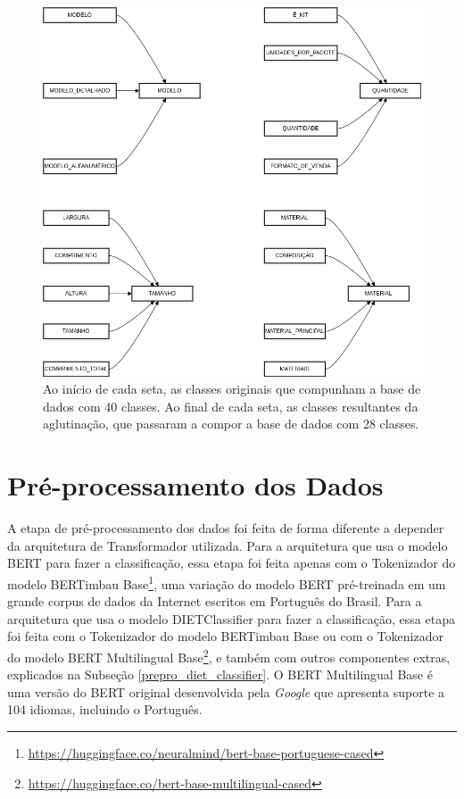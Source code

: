 \begin{figure}[!htb]
        \centering
        \includegraphics[width=14cm]{figuras/aglutinacao_de_classes_pt.png}
        \caption{Ao início de cada seta, as classes originais que compunham a base de dados com 40 classes. Ao final de cada seta, as classes resultantes da aglutinação, que passaram a compor a base de dados com 28 classes.}
        \label{fig:aglutinacao_classes}
\end{figure}


\section{Pré-processamento dos Dados}
\label{pre_processamento_dados}
A etapa de pré-processamento dos dados foi feita de forma diferente a depender da arquitetura de Transformador utilizada. Para a arquitetura que usa o modelo BERT para fazer a classificação, essa etapa foi feita apenas com o Tokenizador do modelo BERTimbau Base\footnote{\url{https://huggingface.co/neuralmind/bert-base-portuguese-cased}}, uma variação do modelo BERT pré-treinada em um grande corpus de dados da Internet escritos em Português do Brasil. Para a arquitetura que usa o modelo DIETClassifier para fazer a classificação, essa etapa foi feita com o Tokenizador do modelo BERTimbau Base ou com o Tokenizador do modelo BERT Multilingual Base\footnote{\url{https://huggingface.co/bert-base-multilingual-cased}}, e também com outros componentes extras, explicados na Subseção \ref{prepro_diet_classifier}. O BERT Multilingual Base é uma versão do BERT original desenvolvida pela \textit{Google} que apresenta suporte a 104 idiomas, incluindo o Português.

